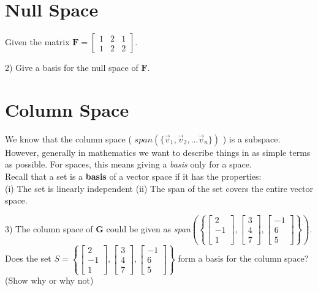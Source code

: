 \documentclass{article}
\begin{document}
\begin{flushleft}
\section*{Null Space}
Given the matrix $\textbf{F} = \begin{bmatrix} 1 & 2 & 1\\ 1 & 2 & 2 \end{bmatrix}$.

\vspace{0.1in}

2) Give a basis for the null space of $\textbf{F}$. 

\vspace{1.5in}

\section*{Column Space}
We know that the column space ( $span( \{ \vec{v}_1 , \vec{v}_2, \ldots \vec{v}_n \} )$ ) is a subspace. However, generally in mathematics we want to describe things in as simple terms as possible. For spaces, this means giving a \textit{basis} only for a space. \\
Recall that a set is a \textbf{basis} of a vector space if it has the properties:\\
(i) The set is linearly independent \hspace{.25in} (ii) The span of the set covers the entire vector space.\\

\vspace{0.2in}

3) The column space of \textbf{G} could be given as \textit{span}$ \left( \left\{ \begin{bmatrix} 2 \\ -1 \\ 1\end{bmatrix}, \begin{bmatrix} 3 \\ 4 \\ 7 \end{bmatrix}, \begin{bmatrix} -1 \\ 6 \\ 5 \end{bmatrix} \right\} \right)$. Does the set $S=\left\{ \begin{bmatrix} 2 \\ -1 \\ 1 \end{bmatrix}, \begin{bmatrix} 3 \\ 4 \\ 7 \end{bmatrix}, \begin{bmatrix} -1 \\ 6 \\ 5 \end{bmatrix} \right\}$ form a basis for the column space? (Show why or why not)


\end{flushleft}
\end{document}
